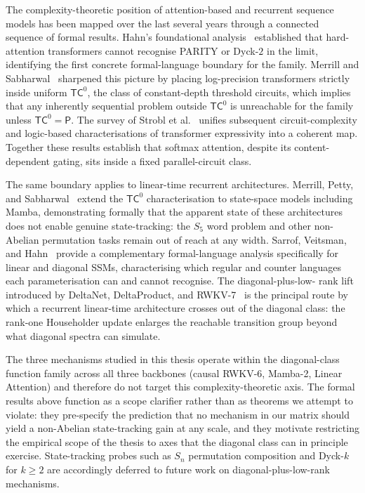   The complexity-theoretic position of attention-based and
  recurrent sequence models has been mapped over the last several
  years through a connected sequence of formal results. Hahn's
  foundational analysis~\cite{hahn2020limitations} established that
  hard-attention transformers cannot recognise PARITY or Dyck-$2$
  in the limit, identifying the first concrete formal-language
  boundary for the family. Merrill and
  Sabharwal~\cite{merrill2023parallelism} sharpened this picture
  by placing log-precision transformers strictly inside uniform
  $\mathsf{TC}^0$, the class of constant-depth threshold circuits,
  which implies that any inherently sequential problem outside
  $\mathsf{TC}^0$ is unreachable for the family unless
  $\mathsf{TC}^0 = \mathsf{P}$. The survey of Strobl et
  al.~\cite{strobl2024formal} unifies subsequent circuit-complexity
  and logic-based characterisations of transformer expressivity
  into a coherent map. Together these results establish that
  softmax attention, despite its content-dependent gating, sits
  inside a fixed parallel-circuit class.

  The same boundary applies to linear-time recurrent
  architectures. Merrill, Petty, and
  Sabharwal~\cite{merrill2024illusion} extend the
  $\mathsf{TC}^0$ characterisation to state-space models including
  Mamba, demonstrating formally that the apparent state of these
  architectures does not enable genuine state-tracking: the
  $S_5$ word problem and other non-Abelian permutation tasks remain
  out of reach at any width. Sarrof, Veitsman, and
  Hahn~\cite{sarrof2024expressive} provide a complementary
  formal-language analysis specifically for linear and diagonal SSMs,
  characterising which regular and counter languages each
  parameterisation can and cannot recognise. The diagonal-plus-low-
  rank lift introduced by DeltaNet, DeltaProduct, and
  RWKV-7~\cite{schlag2021deltanet,yang2024deltanet,peng2025rwkv7} is
  the principal route by which a recurrent linear-time architecture
  crosses out of the diagonal class: the rank-one Householder
  update enlarges the reachable transition group beyond what diagonal
  spectra can simulate.

  The three mechanisms studied in this thesis operate within the
  diagonal-class function family across all three backbones (causal
  RWKV-6, Mamba-2, Linear Attention) and therefore do not target
  this complexity-theoretic axis. The formal results above function
  as a scope clarifier rather than as theorems we attempt to violate:
  they pre-specify the prediction that no mechanism in our matrix
  should yield a non-Abelian state-tracking gain at any scale, and
  they motivate restricting the empirical scope of the thesis to
  axes that the diagonal class can in principle exercise.
  State-tracking probes such as $S_n$ permutation composition and
  Dyck-$k$ for $k \ge 2$ are accordingly deferred to future work
  on diagonal-plus-low-rank mechanisms.

